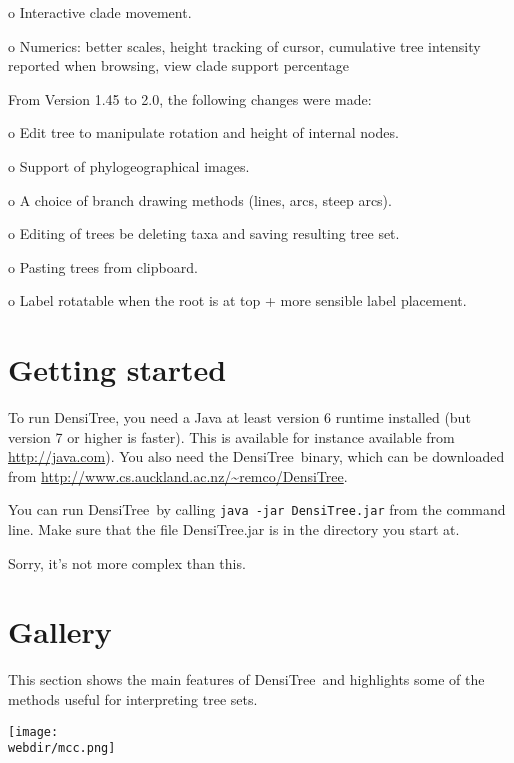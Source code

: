 \documentclass{article}
\def\DensiTree{DensiTree}
\def\webdir{/Users/remco/research/DensiTree/web}
\begin{document}
o Interactive clade movement.

o Numerics: better scales, height tracking of cursor, cumulative tree intensity reported when browsing, view clade support percentage

\noindent From Version 1.45 to 2.0, the following changes were made:

o Edit tree to manipulate rotation and height of internal nodes.

o Support of phylogeographical images.

o A choice of branch drawing methods (lines, arcs, steep arcs).

o Editing of trees be deleting taxa and saving resulting tree set.

o Pasting trees from clipboard.

o Label rotatable when the root is at top + more sensible label placement.

\newpage
\section{Getting started\label{sec.start}}

To run \DensiTree, you need a Java at least version 6 runtime installed (but version 7 or higher is faster). This is available for instance available from \url{http://java.com}). You also need the \DensiTree\ binary,
which can be downloaded from \url{http://www.cs.auckland.ac.nz/~remco/DensiTree}.

You can run \DensiTree\ by calling {\tt java -jar DensiTree.jar} from the command line. Make sure that the file DensiTree.jar is in the directory you start at.

Sorry, it's not more complex than this.

\newpage
\section{Gallery\label{sec.gal}}

This section shows the main features of \DensiTree\ and highlights some of the
methods useful for interpreting tree sets.

\begin{center}
\texttt{[image: \\webdir/mcc.png]}
\end{center}
\end{document}

